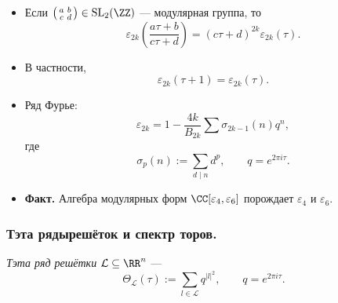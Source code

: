 \documentclass[12pt,a4paper]{article}
\DeclareMathOperator{\SL}{SL}
\begin{document}
    \begin{remark}
        \begin{itemize}
            \item Если $\left(\begin{smallmatrix}a&b\\c&d\end{smallmatrix}\right) \in \SL_2(\ZZ)$ --- модулярная группа, то
                \[\varepsilon_{2k}\left(\frac{a \tau + b}{c \tau + d}\right) = (c \tau + d)^{2k} \varepsilon_{2k}(\tau).\]
            \item В частности,
                \[\varepsilon_{2k}(\tau + 1) = \varepsilon_{2k}(\tau).\]
            \item Ряд Фурье:
                \[\varepsilon_{2k} = 1 - \frac{4k}{B_{2k}} \sum \sigma_{2k-1}(n) q^n,\]
                где
                \[\sigma_p(n) := \sum_{d \mid n} d^p, \qquad q = e^{2\pi i \tau}.\]
            \item \textbf{Факт.} Алгебра модулярных форм $\CC[\varepsilon_4, \varepsilon_6]$ порождает $\varepsilon_4$ и $\varepsilon_6$.
        \end{itemize}
    \end{remark}

    \subsubsection*{Тэта рядырешёток и спектр торов.}

    \begin{definition}
        \emph{Тэта ряд решётки $\mathcal{L} \subseteq \RR^n$} ---
        \[\Theta_{\mathcal{L}}(\tau) := \sum_{l \in \mathcal{L}} q^{|l|^2}, \qquad q = e^{2\pi i \tau}.\]
    \end{definition}
\end{document}

